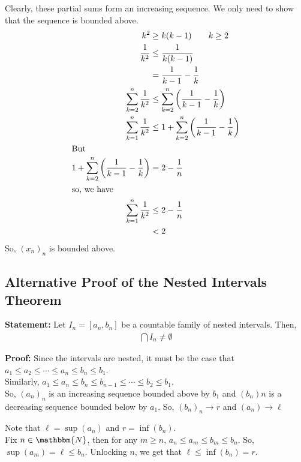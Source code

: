 \documentclass[10pt]{extarticle}
\newcommand{\N}{\mathbbm{N}}
\begin{document}
    Clearly, these partial sums form an increasing sequence. We only need to show that the sequence is bounded above.
    \begin{align*}
      k^2 &\geq k(k-1)\tag*{$k\geq 2$}\\
      \frac{1}{k^2} &\leq \frac{1}{k(k-1)}\\
                    &= \frac{1}{k-1}-\frac{1}{k}\\
      \sum_{k=2}^{n} \frac{1}{k^2} &\leq \sum_{k=2}^{n} \left(\frac{1}{k-1}-\frac{1}{k}\right)\\
      \sum_{k=1}^{n} \frac{1}{k^2} &\leq 1 + \sum_{k=2}^{n} \left(\frac{1}{k-1}-\frac{1}{k}\right)\\
      \shortintertext{But}
      1 + \sum_{k=2}^{n} \left(\frac{1}{k-1}-\frac{1}{k}\right) &= 2 - \frac{1}{n}\\
      \shortintertext{so, we have}
      \sum_{k=1}^{n} \frac{1}{k^2} &\leq 2-\frac{1}{n}\\
                                   &< 2
    \end{align*}
    So, $(x_n)_n$ is bounded above.
  \subsection{Alternative Proof of the Nested Intervals Theorem}%
  \textbf{Statement:} Let $I_n = [a_n,b_n]$ be a countable family of nested intervals. Then,
    \begin{align*}
      \bigcap I_n \neq \emptyset
    \end{align*}

    \textbf{Proof:} Since the intervals are nested, it must be the case that $a_{1} \leq a_2 \leq \cdots \leq a_{n} \leq b_{n} \leq b_{1}$.\\

    Similarly, $a_1 \leq a_{n} \leq b_{n} \leq b_{n-1} \leq \cdots \leq b_{2} \leq b_{1}$.\\

    So, $\left(a_n\right)_n$ is an increasing sequence bounded above by $b_{1}$ and $\left(b_n\right)n$ is a decreasing sequence bounded below by $a_{1}$. So, $\left(b_n\right)_n \rightarrow r$ and $\left(a_n\right)\rightarrow \ell$

    Note that $\ell = \sup(a_n)$ and $r = \inf(b_n)$.\\

    Fix $n\in\N$, then for any $m \geq n$, $a_{n} \leq a_{m} \leq b_{m} \leq b_{n}$. So, $\sup(a_m) = \ell \leq b_{n}$. Unlocking $n$, we get that $\ell \leq \inf(b_n) = r$.
\end{document}
